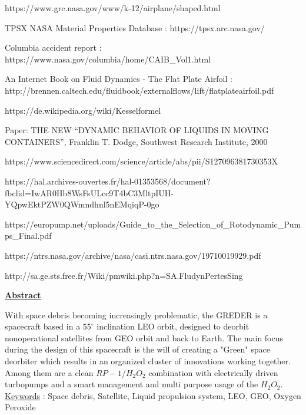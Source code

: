 \documentclass[a4paper,12pt,calibri,oneside,openany]{book}
\theoremstyle{break}
\begin{document}
\begin{enumerate}
{	\item https://www.grc.nasa.gov/www/k-12/airplane/shaped.html
	\item TPSX NASA Material Properties Database : https://tpsx.arc.nasa.gov/ 
	\item Columbia accident report : https://www.nasa.gov/columbia/home/CAIB\_Vol1.html
	\item  An Internet Book on Fluid Dynamics - The Flat Plate Airfoil :\\http://brennen.caltech.edu/fluidbook/externalflows/lift/flatplateairfoil.pdf
	\item https://de.wikipedia.org/wiki/Kesselformel
	\item Paper: THE NEW “DYNAMIC BEHAVIOR OF LIQUIDS IN MOVING CONTAINERS”, Franklin T. Dodge, Southwest Research Institute, 2000

	\item https://www.sciencedirect.com/science/article/abs/pii/S127096381730353X
	\item https://hal.archives-ouvertes.fr/hal-01353568/document?fbclid=IwAR0Hb8WsFsULcc9T4bC3MltpIUH-YQpwEktPZW0QWmndhnl5nEMqiqP-0go
	\item https://europump.net/uploads/Guide\_to\_the\_Selection\_of\_Rotodynamic\_Pumps\_Final.pdf
	\item https://ntrs.nasa.gov/archive/nasa/casi.ntrs.nasa.gov/19710019929.pdf
	\item http://sa.ge.sts.free.fr/Wiki/pmwiki.php?n=SA.FludynPertesSing
}
\end{enumerate}
\pagebreak
\thispagestyle{empty}
\begin{center}
	\textbf{\underline{\Large Abstract}}
\end{center}

	With space debris becoming increasingly problematic, the GREDER is a spacecraft based in a $55^\circ$ inclination LEO orbit, designed to deorbit nonoperational satellites from GEO orbit and back to Earth. The main focus during the design of this spacecraft is the will of creating a "Green" space deorbiter which results in an organized cluster of innovations working together. Among them are a clean $RP-1$/$H_2O_2$ combination with electrically driven turbopumps and a smart management and multi purpose usage of the $H_2O_2$.\\
	
	\underline{Keywords} : Space debris, Satellite, Liquid propulsion system, LEO, GEO, Oxygen Peroxide
\end{document}
